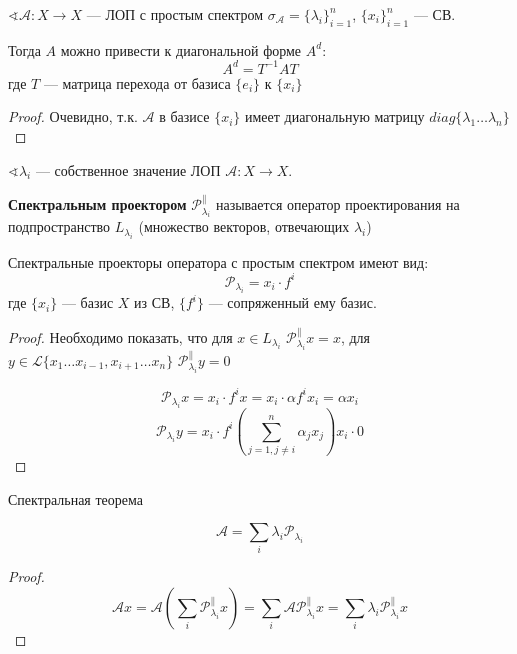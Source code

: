 \begin{theorem}
    $\sphericalangle \mathcal A : X \to X$ --- ЛОП с простым спектром $\sigma_{\mathcal A} = \{\lambda_i\}_{i=1}^n$, $\{x_i\}_{i=1}^n$ --- СВ.
    
    Тогда $A$ можно привести к диагональной форме $A^d$:
    $$A^d = T^{-1} A T$$
    где $T$ --- матрица перехода от базиса $\{e_i\}$ к $\{x_i\}$
\end{theorem}
\begin{proof}
    Очевидно, т.к. $\mathcal A$ в базисе $\{x_i\}$ имеет диагональную матрицу $diag\{\lambda_1 \ldots \lambda_n\}$
\end{proof}

\begin{definition}
    $\sphericalangle \lambda_i$ --- собственное значение ЛОП $\mathcal A : X\to X$.

    \textbf{Спектральным проектором} $\mathcal P_{\lambda_i}^{\parallel}$ называется оператор проектирования на подпространство $L_{\lambda_i}$ (множество векторов, отвечающих $\lambda_i$)
\end{definition}

\begin{lemma}
    Спектральные проекторы оператора с простым спектром имеют вид:
    $$\mathcal P_{\lambda_i} = x_i \cdot f^i$$
    где $\{x_i\}$ --- базис $X$ из СВ, $\{f^i\}$ --- сопряженный ему базис.
\end{lemma}
\begin{proof}
    Необходимо показать, что для $x\in L_{\lambda_i}$ $\mathcal P_{\lambda_i}^{\parallel} x=x$, для $y\in \mathcal L\{x_1\ldots x_{i-1}, x_{i+1}\ldots x_n\}$ $\mathcal P_{\lambda_i}^{\parallel} y=0$

    $$\mathcal P_{\lambda_i} x = x_i \cdot f^i x = x_i \cdot \alpha f^i x_i = \alpha x_i$$
    $$\mathcal P_{\lambda_i} y = x_i \cdot f^i \left(\sum_{j=1, j\not=i}^n \alpha_jx_j \right) x_i \cdot 0$$
\end{proof}

\begin{theorem}
    Спектральная теорема

    $$\mathcal A = \sum_i \lambda_i \mathcal P_{\lambda_i}$$
\end{theorem}
\begin{proof}
    $$\mathcal A x = \mathcal A\left( \sum_i \mathcal P_{\lambda_i}^{\parallel} x \right) = \sum_i \mathcal A \mathcal P_{\lambda_i}^{\parallel} x = \sum_i \lambda_i \mathcal P_{\lambda_i}^{\parallel} x$$
\end{proof}

